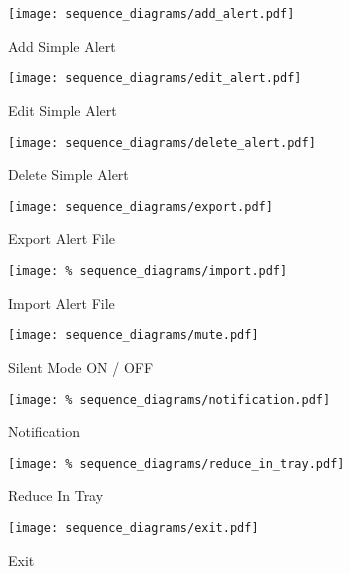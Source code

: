 \begin{figure}[]
	\centering
    \caption{Add Simple Alert}\label{fig:sd_add_simple_alert}
    \texttt{[image: sequence\_diagrams/add\_alert.pdf]}
\end{figure}

\begin{figure}[]
	\centering
    \caption{Edit Simple Alert}\label{fig:sd_edit_simple_alert}
    \texttt{[image: sequence\_diagrams/edit\_alert.pdf]}
\end{figure}

\begin{figure}[]
	\centering
    \caption{Delete Simple Alert}\label{fig:sd_delete_simple_alert}
    \texttt{[image: sequence\_diagrams/delete\_alert.pdf]}
\end{figure}

\begin{figure}[]
	\centering
    \caption{Export Alert File}\label{fig:sd_export_alert_file}
    \texttt{[image: sequence\_diagrams/export.pdf]}
\end{figure}

\begin{figure}[]
	\centering
    \caption{Import Alert File}\label{fig:sd_import_alert_file}
    \texttt{[image: \%
    sequence\_diagrams/import.pdf]}
\end{figure}

\begin{figure}[]
	\centering
    \caption{Silent Mode ON / OFF}\label{fig:sd_silent_mode}
	\texttt{[image: sequence\_diagrams/mute.pdf]}
\end{figure}

\begin{figure}[]
	\centering
    \caption{Notification}\label{fig:sd_notification}
	\texttt{[image: \%
    sequence\_diagrams/notification.pdf]}
\end{figure}

\begin{figure}[]
	\centering
    \caption{Reduce In Tray}\label{fig:sd_reduce_in_tray}
	\texttt{[image: \%
    sequence\_diagrams/reduce\_in\_tray.pdf]}
\end{figure}

\begin{figure}[]
	\centering
    \caption{Exit}\label{fig:sd_exit}
	\texttt{[image: sequence\_diagrams/exit.pdf]}
\end{figure}
